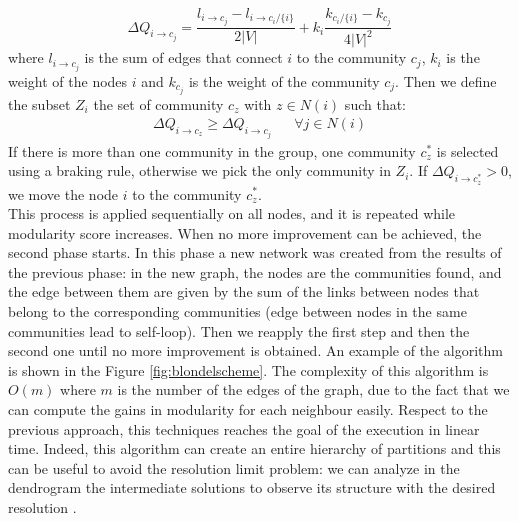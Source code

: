 \begin{equation}\label{delta_q}
\Delta Q_{i \rightarrow c_j} = \frac{l_{i\rightarrow c_j} - l_{i\rightarrow c_i / \{i\}}}{2|V|} + k_i \frac{k_{c_i / \{i\}} - k_{c_j}}{4|V|^2}
\end{equation}
where $l_{i\rightarrow c_j}$ is the sum of edges that connect $i$ to the community $c_j$, $k_i$ is the weight of the nodes $i$ and $k_{c_j}$ is the weight of the community $c_j$.
Then we define the subset $Z_i$ the set of community $c_z$ with $z \in N(i)$ such that:
\begin{align}
\Delta Q_{i \rightarrow c_z} \geq \Delta Q_{i \rightarrow c_j} && \forall j \in N(i)
\end{align}
If there is more than one community in the group, one community $c_z^*$ is selected using a braking rule, otherwise we pick the only community in $Z_i$. If $\Delta Q_{i \rightarrow c_z^*} > 0$, we move the node $i$ to the community $c_z^*$. \\
This process is applied sequentially on all nodes, and it is repeated while modularity score increases. When no more improvement can be achieved, the second phase starts. In this phase a new network was created from the results of the previous phase: in the new graph, the nodes are the communities found, and the edge between them are given by the sum of the links between nodes that belong to the corresponding communities (edge between nodes in the same communities lead to self-loop). Then we reapply the first step and then the second one until no more improvement is obtained. An example of the algorithm is shown in the Figure \ref{fig:blondelscheme}.
The complexity of this algorithm is $O(m)$ where $m$ is the number of the edges of the graph, due to the fact that we can compute the
gains in modularity for each neighbour easily. Respect to the previous approach, this techniques reaches the goal of the execution in linear time. Indeed, this algorithm can create an entire hierarchy of partitions and this can be useful to avoid the resolution limit problem: we can analyze in the dendrogram the intermediate solutions to observe its structure with the desired resolution \cite{Blondel_2008}.
